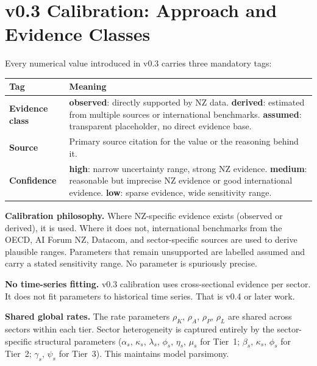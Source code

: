 \documentclass[11pt,a4paper]{article}
\begin{document}
\section{v0.3 Calibration: Approach and Evidence Classes}
\label{sec:cal_approach}

Every numerical value introduced in v0.3 carries three mandatory tags:

\begin{center}
\begin{tabular}{lp{10cm}}
\toprule
Tag & Meaning \\
\midrule
\textbf{Evidence class} & \textbf{observed}: directly supported by NZ data. \textbf{derived}: estimated from multiple sources or international benchmarks. \textbf{assumed}: transparent placeholder, no direct evidence base. \\[4pt]
\textbf{Source} & Primary source citation for the value or the reasoning behind it. \\[4pt]
\textbf{Confidence} & \textbf{high}: narrow uncertainty range, strong NZ evidence. \textbf{medium}: reasonable but imprecise NZ evidence or good international evidence. \textbf{low}: sparse evidence, wide sensitivity range. \\
\bottomrule
\end{tabular}
\end{center}

\textbf{Calibration philosophy.} Where NZ-specific evidence exists (observed or derived), it is used. Where it does not, international benchmarks from the OECD, AI Forum NZ, Datacom, and sector-specific sources are used to derive plausible ranges. Parameters that remain unsupported are labelled assumed and carry a stated sensitivity range. No parameter is spuriously precise.

\textbf{No time-series fitting.} v0.3 calibration uses cross-sectional evidence per sector. It does not fit parameters to historical time series. That is v0.4 or later work.

\textbf{Shared global rates.} The rate parameters $\rho_K$, $\rho_A$, $\rho_P$, $\rho_L$ are shared across sectors within each tier. Sector heterogeneity is captured entirely by the sector-specific structural parameters ($\alpha_s$, $\kappa_s$, $\lambda_s$, $\phi_s$, $\eta_s$, $\mu_s$ for Tier~1; $\beta_s$, $\kappa_s$, $\phi_s$ for Tier~2; $\gamma_s$, $\psi_s$ for Tier~3). This maintains model parsimony.
\end{document}
